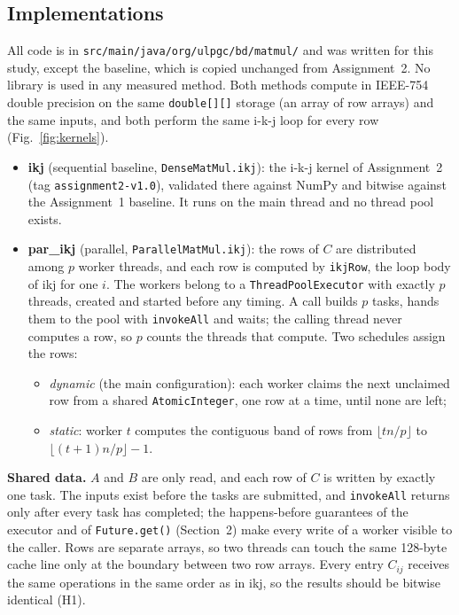 \documentclass[11pt,a4paper]{article}
\begin{document}
\subsection{Implementations}

All code is in \texttt{src/main/java/org/ulpgc/bd/matmul/} and was written for
this study, except the baseline, which is copied unchanged from Assignment~2.
No library is used in any measured method. Both methods compute in IEEE-754
double precision on the same \texttt{double[][]} storage (an array of row
arrays) and the same inputs, and both perform the same i-k-j loop for every row
(Fig.~\ref{fig:kernels}).
\begin{itemize}
  \item \textbf{ikj} (sequential baseline, \texttt{DenseMatMul.ikj}): the i-k-j
  kernel of Assignment~2 (tag \texttt{assignment2-v1.0}), validated there
  against NumPy and bitwise against the Assignment~1 baseline. It runs on the
  main thread and no thread pool exists.
  \item \textbf{par\_ikj} (parallel, \texttt{ParallelMatMul.ikj}): the rows of
  $C$ are distributed among $p$ worker threads, and each row is computed by
  \texttt{ikjRow}, the loop body of ikj for one $i$. The workers belong to a
  \texttt{ThreadPoolExecutor} with exactly $p$ threads, created and started
  before any timing. A call builds $p$ tasks, hands them to the pool with
  \texttt{invokeAll} and waits; the calling thread never computes a row, so $p$
  counts the threads that compute. Two schedules assign the rows:
  \begin{itemize}
    \item \emph{dynamic} (the main configuration): each worker claims the next
    unclaimed row from a shared \texttt{AtomicInteger}, one row at a time,
    until none are left;
    \item \emph{static}: worker $t$ computes the contiguous band of rows from
    $\lfloor tn/p\rfloor$ to $\lfloor(t+1)n/p\rfloor-1$.
  \end{itemize}
\end{itemize}
\textbf{Shared data.} $A$ and $B$ are only read, and each row of $C$ is written
by exactly one task. The inputs exist before the tasks are submitted, and
\texttt{invokeAll} returns only after every task has completed; the
happens-before guarantees of the executor and of \texttt{Future.get()}
(Section~2) make every write of a worker visible to the caller. Rows are
separate arrays, so two threads can touch the same 128-byte cache line only at
the boundary between two row arrays. Every entry $C_{ij}$ receives the same
operations in the same order as in ikj, so the results should be bitwise
identical (H1).
\end{document}

